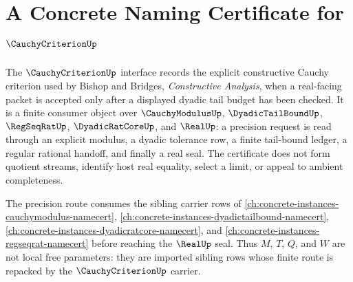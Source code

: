 \chapter{A Concrete Naming Certificate for $\CauchyCriterionUp$}
\label{ch:concrete-instances-cauchycriterion-namecert}

The $\CauchyCriterionUp$ interface records the explicit constructive Cauchy criterion used by Bishop and Bridges, \emph{Constructive Analysis}, when a real-facing packet is accepted only after a displayed dyadic tail budget has been checked. It is a finite consumer object over $\CauchyModulusUp$, $\DyadicTailBoundUp$, $\RegSeqRatUp$, $\DyadicRatCoreUp$, and $\RealUp$: a precision request is read through an explicit modulus, a dyadic tolerance row, a finite tail-bound ledger, a regular rational handoff, and finally a real seal. The certificate does not form quotient streams, identify host real equality, select a limit, or appeal to ambient completeness.

The precision route consumes the sibling carrier rows of \autoref{ch:concrete-instances-cauchymodulus-namecert}, \autoref{ch:concrete-instances-dyadictailbound-namecert}, \autoref{ch:concrete-instances-dyadicratcore-namecert}, and \autoref{ch:concrete-instances-regseqrat-namecert} before reaching the $\RealUp$ seal. Thus $M$, $T$, $Q$, and $W$ are not local free parameters: they are imported sibling rows whose finite route is repacked by the $\CauchyCriterionUp$ carrier.


